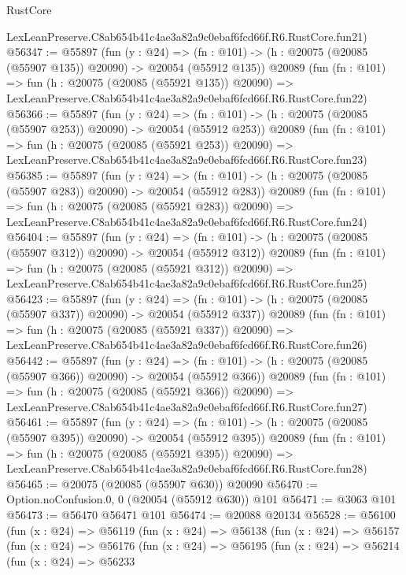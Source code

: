 \begin{lexlean}{RustCore}
\begin{coremodule}
    LexLeanPreserve.C8ab654b41c4ae3a82a9c0ebaf6fcd66f.R6.RustCore.fun21)
@56347 := @55897
    (fun (y : @24) =>
    (fn : @101) -> (h : @20075 (@20085 (@55907 @135)) @20090) -> @20054 (@55912 @135))
    @20089
    (fun (fn : @101) =>
    fun (h : @20075 (@20085 (@55921 @135)) @20090) =>
    LexLeanPreserve.C8ab654b41c4ae3a82a9c0ebaf6fcd66f.R6.RustCore.fun22)
@56366 := @55897
    (fun (y : @24) =>
    (fn : @101) -> (h : @20075 (@20085 (@55907 @253)) @20090) -> @20054 (@55912 @253))
    @20089
    (fun (fn : @101) =>
    fun (h : @20075 (@20085 (@55921 @253)) @20090) =>
    LexLeanPreserve.C8ab654b41c4ae3a82a9c0ebaf6fcd66f.R6.RustCore.fun23)
@56385 := @55897
    (fun (y : @24) =>
    (fn : @101) -> (h : @20075 (@20085 (@55907 @283)) @20090) -> @20054 (@55912 @283))
    @20089
    (fun (fn : @101) =>
    fun (h : @20075 (@20085 (@55921 @283)) @20090) =>
    LexLeanPreserve.C8ab654b41c4ae3a82a9c0ebaf6fcd66f.R6.RustCore.fun24)
@56404 := @55897
    (fun (y : @24) =>
    (fn : @101) -> (h : @20075 (@20085 (@55907 @312)) @20090) -> @20054 (@55912 @312))
    @20089
    (fun (fn : @101) =>
    fun (h : @20075 (@20085 (@55921 @312)) @20090) =>
    LexLeanPreserve.C8ab654b41c4ae3a82a9c0ebaf6fcd66f.R6.RustCore.fun25)
@56423 := @55897
    (fun (y : @24) =>
    (fn : @101) -> (h : @20075 (@20085 (@55907 @337)) @20090) -> @20054 (@55912 @337))
    @20089
    (fun (fn : @101) =>
    fun (h : @20075 (@20085 (@55921 @337)) @20090) =>
    LexLeanPreserve.C8ab654b41c4ae3a82a9c0ebaf6fcd66f.R6.RustCore.fun26)
@56442 := @55897
    (fun (y : @24) =>
    (fn : @101) -> (h : @20075 (@20085 (@55907 @366)) @20090) -> @20054 (@55912 @366))
    @20089
    (fun (fn : @101) =>
    fun (h : @20075 (@20085 (@55921 @366)) @20090) =>
    LexLeanPreserve.C8ab654b41c4ae3a82a9c0ebaf6fcd66f.R6.RustCore.fun27)
@56461 := @55897
    (fun (y : @24) =>
    (fn : @101) -> (h : @20075 (@20085 (@55907 @395)) @20090) -> @20054 (@55912 @395))
    @20089
    (fun (fn : @101) =>
    fun (h : @20075 (@20085 (@55921 @395)) @20090) =>
    LexLeanPreserve.C8ab654b41c4ae3a82a9c0ebaf6fcd66f.R6.RustCore.fun28)
@56465 := @20075 (@20085 (@55907 @630)) @20090
@56470 := Option.noConfusion.{0, 0} (@20054 (@55912 @630)) @101
@56471 := @3063 @101
@56473 := @56470 @56471 @101
@56474 := @20088 @20134
@56528 := @56100
    (fun (x : @24) =>
    @56119
      (fun (x : @24) =>
      @56138
        (fun (x : @24) =>
        @56157
          (fun (x : @24) =>
          @56176
            (fun (x : @24) =>
            @56195
              (fun (x : @24) =>
              @56214
                (fun (x : @24) =>
                @56233

\end{coremodule}
\end{lexlean}
